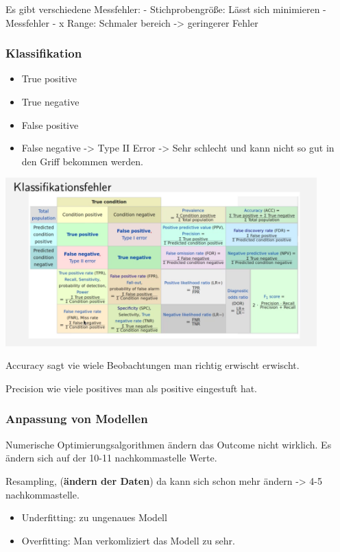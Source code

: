 \documentclass[
]{article}
\providecommand{\tightlist}{%
  \setlength{\itemsep}{0pt}\setlength{\parskip}{0pt}}
\begin{document}
Es gibt verschiedene Messfehler: - Stichprobengröße: Lässt sich
minimieren - Messfehler - x Range: Schmaler bereich -\textgreater{}
geringerer Fehler

\hypertarget{klassifikation-1}{%
\subsubsection{Klassifikation}\label{klassifikation-1}}

\begin{itemize}
\tightlist
\item
  True positive
\item
  True negative
\item
  False positive
\item
  False negative -\textgreater{} Type II Error -\textgreater{} Sehr
  schlecht und kann nicht so gut in den Griff bekommen werden.
\end{itemize}

\includegraphics[width=12cm, center]{Fig13}

Accuracy sagt vie wiele Beobachtungen man richtig erwischt erwischt.

Precision wie viele positives man als positive eingestuft hat.

\hypertarget{anpassung-von-modellen}{%
\subsubsection{Anpassung von Modellen}\label{anpassung-von-modellen}}

Numerische Optimierungsalgorithmen ändern das Outcome nicht wirklich. Es
ändern sich auf der 10-11 nachkommastelle Werte.

Resampling, (\textbf{ändern der Daten}) da kann sich schon mehr ändern
-\textgreater{} 4-5 nachkommastelle.

\begin{itemize}
\tightlist
\item
  Underfitting: zu ungenaues Modell
\item
  Overfitting: Man verkomliziert das Modell zu sehr.
\end{itemize}
\end{document}
